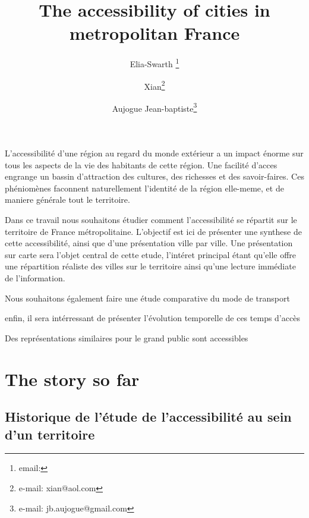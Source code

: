 \documentclass{vgtc}                          %
\title{The accessibility of cities in metropolitan France}
\author{Elia-Swarth \thanks{email:}\\ %
\and Xian\thanks{e-mail: xian@aol.com}\\ %
\and Aujogue Jean-baptiste\thanks{e-mail: jb.aujogue@gmail.com}} %
\begin{document}


\maketitle
L'accessibilité d'une région au regard du monde extérieur a un impact énorme sur tous les aspects de la vie des habitants de cette région. Une facilité d'acces engrange un bassin d'attraction des cultures, des richesses et des savoir-faires. Ces phéniomènes faconnent naturellement l'identité de la région elle-meme, et de maniere générale tout le territoire.



Dans ce travail nous souhaitons étudier comment l'accessibilité se répartit sur le territoire de France métropolitaine. L'objectif est ici de présenter une synthese de cette accessibilité, ainsi que d'une présentation ville par ville. Une présentation sur carte sera l'objet central de cette etude, l'intéret principal étant qu'elle offre une répartition réaliste des villes sur le territoire ainsi qu'une lecture immédiate de l'information. 

Nous souhaitons également faire une étude comparative du mode de transport

enfin, il sera intérressant de présenter l'évolution temporelle de ces temps d'accès


Des représentations similaires pour le grand public sont accessibles \cite{LeMonde1}

\vspace{0.3cm}
\section{The story so far}

\vspace{0.3cm}

\subsection{Historique de l'étude de l'accessibilité au sein d'un territoire}
\end{document}
